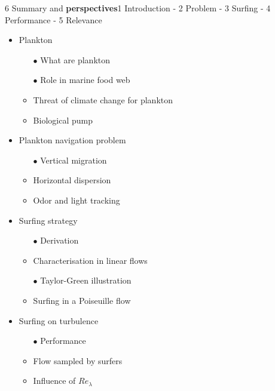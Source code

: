 \begin{frame}{6 Summary and \textbf{perspectives}}{1 Introduction - 2 Problem - 3 Surfing - 4 Performance - 5 Relevance}
	\centering
	\vspace{-10pt}
	\small
	\begin{multicols}{2}
		\begin{itemize}
			\item \textcolor{ColorSurf}{Plankton}
				\begin{itemize}
					\scriptsize
					\item[$\bullet$] \textcolor{ColorSurf}{What are plankton}
					\item[$\bullet$] \textcolor{ColorSurf}{Role in marine food web}
					\item<2->[$\bullet$] Threat of climate change for plankton
					\item<2->[$\bullet$] Biological pump
				\end{itemize}
			\item \textcolor{ColorSurf}{Plankton navigation problem}
				\begin{itemize}
					\scriptsize
					\item[$\bullet$] \textcolor{ColorSurf}{Vertical migration}
					\item<2->[$\bullet$] Horizontal dispersion
					\item<2->[$\bullet$] Odor and light tracking
				\end{itemize}
			\item \textcolor{ColorSurf}{Surfing strategy}
				\begin{itemize}
					\scriptsize
					\item[$\bullet$] \textcolor{ColorSurf}{Derivation}
					\item<2->[$\bullet$] Characterisation in linear flows
					\item[$\bullet$] \textcolor{ColorSurf}{Taylor-Green illustration}
					\item<2->[$\bullet$] Surfing in a Poiseuille flow
				\end{itemize}
			\item \textcolor{ColorSurf}{Surfing on turbulence}
				\begin{itemize}
					\scriptsize
					\item[$\bullet$] \textcolor{ColorSurf}{Performance}
					\item<2->[$\bullet$] Flow sampled by surfers
					\item<2->[$\bullet$] Influence of $\mathit{Re}_{\lambda}$

\end{itemize}
\end{itemize}
\end{multicols}
\end{frame}
